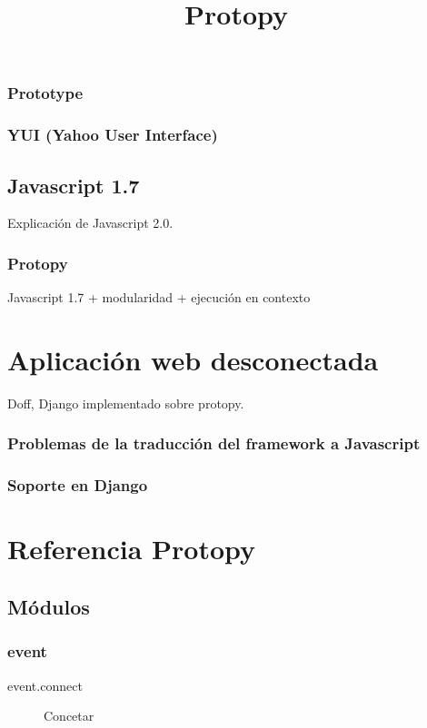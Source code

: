 \documentclass[a4paper]{report}
\begin{document}
\subsection{Prototype}
\subsection{YUI (Yahoo User Interface)}

\section{Javascript 1.7}
Explicación de Javascript 2.0.

\subsection{Protopy}
Javascript 1.7 + modularidad + ejecución en contexto

\chapter{Aplicación web desconectada}
Doff, Django implementado sobre protopy.
\subsection{Problemas de la traducción del framework a Javascript}
\subsection{Soporte en Django}


\appendix

\title{Protopy}
\chapter{Referencia Protopy}

\section{Módulos}
\subsection{event}
\begin{description}
\item[event.connect]{Concetar}
\end{description}
\end{document}
